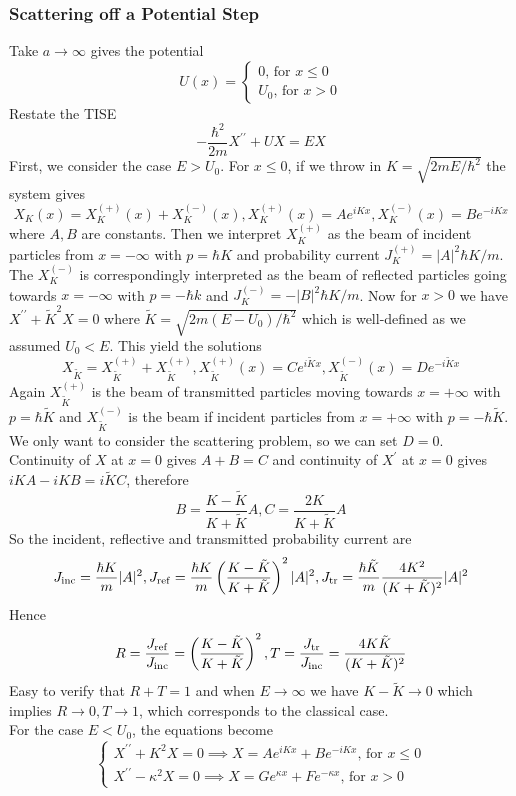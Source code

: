 \subsubsection{Scattering off a Potential Step}
Take $a\to\infty$ gives the potential
$$U(x)=\begin{cases}
    0\text{, for $x\le 0$}\\
    U_0\text{, for $x>0$}
\end{cases}$$
Restate the TISE
$$-\frac{\hbar^2}{2m}X^{\prime\prime}+UX=EX$$
First, we consider the case $E>U_0$.
For $x\le 0$, if we throw in $K=\sqrt{2mE/\hbar^2}$ the system gives
$$X_K(x)=X_K^{(+)}(x)+X_K^{(-)}(x),X_K^{(+)}(x)=Ae^{iKx},X_K^{(-)}(x)=Be^{-iKx}$$
where $A,B$ are constants.
Then we interpret $X_K^{(+)}$ as the beam of incident particles from $x=-\infty$ with $p=\hbar K$ and probability current $J_K^{(+)}=|A|^2\hbar K/m$.
The $X_K^{(-)}$ is correspondingly interpreted as the beam of reflected particles going towards $x=-\infty$ with $p=-\hbar k$ and $J_K^{(-)}=-|B|^2\hbar K/m$.
Now for $x>0$ we have $X^{\prime\prime}+\tilde{K}^2X=0$ where $\tilde{K}=\sqrt{2m(E-U_0)/\hbar^2}$ which is well-defined as we assumed $U_0<E$.
This yield the solutions
$$X_{\tilde{K}}=X_{\tilde{K}}^{(+)}+X_{\tilde{K}}^{(+)},X_{\tilde{K}}^{(+)}(x)=Ce^{i\tilde{K}x},X_{\tilde{K}}^{(-)}(x)=De^{-i\tilde{K}x}$$
Again $X_{\tilde{K}}^{(+)}$ is the beam of transmitted particles moving towards $x=+\infty$ with $p=\hbar\tilde{K}$ and $X_{\tilde{K}}^{(-)}$ is the beam if incident particles from $x=+\infty$ with $p=-\hbar \tilde{K}$.
We only want to consider the scattering problem, so we can set $D=0$.
Continuity of $X$ at $x=0$ gives $A+B=C$ and continuity of $X^\prime$ at $x=0$ gives $iKA-iKB=i\tilde{K}C$, therefore
$$B=\frac{K-\tilde{K}}{K+\tilde{K}}A,C=\frac{2K}{K+\tilde{K}}A$$
So the incident, reflective and transmitted probability current are
$$J_{\rm inc}=\frac{\hbar K}{m}|A|^2,J_{\rm ref}=\frac{\hbar K}{m}\left( \frac{K-\tilde{K}}{K+\tilde{K}} \right)^2|A|^2,J_{\rm tr}=\frac{\hbar \tilde{K}}{m}\frac{4K^2}{(K+\tilde{K})^2}|A|^2$$
Hence
$$R=\frac{J_{\rm ref}}{J_{\rm inc}}=\left( \frac{K-\tilde{K}}{K+\tilde{K}} \right)^2,T=\frac{J_{\rm tr}}{J_{\rm inc}}=\frac{4K\tilde{K}}{(K+\tilde{K})^2}$$
Easy to verify that $R+T=1$ and when $E\to \infty$ we have $K-\tilde{K}\to 0$ which implies $R\to 0,T\to 1$, which corresponds to the classical case.\\
For the case $E<U_0$, the equations become
$$\begin{cases}
    X^{\prime\prime}+K^2X=0\implies X=Ae^{iKx}+Be^{-iKx}\text{, for $x\le 0$}\\
    X^{\prime\prime}-\kappa^2X=0\implies X=Ge^{\kappa x}+Fe^{-\kappa x}\text{, for $x>0$}
\end{cases}$$
